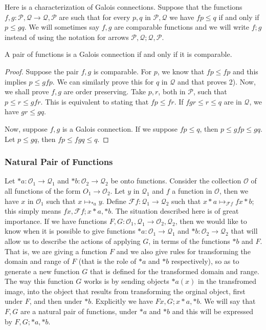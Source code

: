 \documentclass [12pt]{book}
\begin{document}
Here is a characterization of Galois connections.
Suppose that the functions $f,g:\mathcal P,\mathcal Q\rightarrow\mathcal Q,\mathcal P$ are such that for every $p,q$ in $\mathcal P,\mathcal Q$ we have $fp\leq q$ if and only if $p\leq gq$. We will sometimes say $f,g$ are comparable functions and we will write $f;g$ instead of using the notation for arrows $\mathcal P,\mathcal Q;\mathcal Q,\mathcal P$.

\begin{proposition}A pair of functions is a Galois connection if and only if it is comparable.\end{proposition}

\begin{proof}Suppose the pair $f,g$ is comparable. For $p$, we know that $fp\leq fp$ and this implies $p\leq gfp$. We can similarly prove this for $q$ in $\mathcal Q$ and that proves 2). Now, we shall prove $f,g$ are order preserving. Take $p,r$, both in $\mathcal P$, such that $p\leq r\leq gfr$. This is equivalent to stating that $fp\leq fr$. If $fgr\leq r\leq q$ are in $\mathcal Q$, we have $gr\leq gq$.

Now, suppose $f,g$ is a Galois connection. If we suppose $fp\leq q$, then $p\leq gfp\leq gq$. Let $p\leq gq$, then $fp\leq fgq\leq q$.\end{proof}

\subsubsection{Natural Pair of Functions} 

Let $*a:\mathcal{O}_1\rightarrow\mathcal{Q}_1$ and $*b:\mathcal{O}_2\rightarrow\mathcal{Q}_2$ be onto functions. Consider the collection $\mathcal{O}$ of all functions of the form $O_1\rightarrow\mathcal{O}_2$. Let $y$ in $\mathcal{Q}_1$ and $f$ a function in $\mathcal{O}$, then we have $x$ in $\mathcal{O}_1$ such that $x\mapsto_{*a}y$. Define $\mathcal{F}f:\mathcal{Q}_1\rightarrow\mathcal{Q}_2$ such that $ x*a\mapsto_{\mathcal{F}f}fx*b$; this simply means $fx,\mathcal{F}f;x*a,*b$. The situation described here is of great importance. If we have functions $F,G:\mathcal{O}_1,\mathcal{Q}_1\rightarrow\mathcal{O}_2,\mathcal{Q}_2$, then we would like to know when it is possible to give functions $*a:\mathcal{O}_1\rightarrow\mathcal{Q}_1$ and $*b:\mathcal{O}_2\rightarrow\mathcal{Q}_2$ that will allow us to describe the actions of applying $G$, in terms of the functions $*b$ and $F$. That is, we are giving a function $F$ and we also give rules for transforming the domain and range of $F$ (that is the role of $*a$ and $*b$ respectively), so as to generate a new function $G$ that is defined for the transformed domain and range. The way this function $G$ works is by sending objects $*a(x)$ in the transfromed image, into the object that results from transforming the orginal object, first under $F$, and then under $*b$. Explicitly we have $Fx,G;x*a,*b$. We will say that $F,G$ are a natural pair of functions, under $*a$ and $*b$ and this will be expressed by $F,G;*a,*b$.
\end{document}
